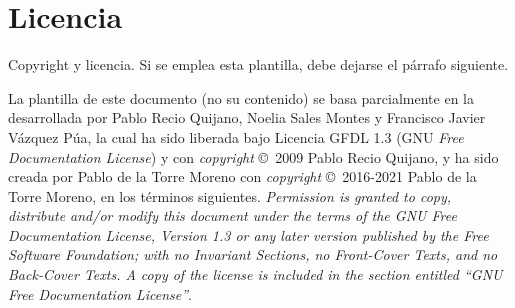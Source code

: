 \section*{Licencia} %
\label{sec:license}

\begin{shaded}
Copyright y licencia. Si se emplea esta plantilla, debe dejarse el párrafo siguiente.
\end{shaded}

La plantilla de este documento (no su contenido) se basa parcialmente en la desarrollada por Pablo Recio Quijano, Noelia Sales Montes y Francisco Javier Vázquez Púa, la cual ha sido liberada bajo Licencia GFDL 1.3 (GNU \textit{Free Documentation License}) y con \textit{copyright} \copyright\ 2009 Pablo Recio Quijano, y ha sido creada por Pablo de la Torre Moreno con \textit{copyright} \copyright\ 2016-2021 Pablo de la Torre Moreno, en los términos siguientes. \textit{Permission is granted to copy, distribute and/or modify this document under the terms of the GNU Free Documentation License, Version 1.3 or any later version published by the Free Software Foundation; with no Invariant Sections, no Front-Cover Texts, and no Back-Cover Texts. A copy of the license is included in the section entitled ``GNU Free Documentation License''}.\\
